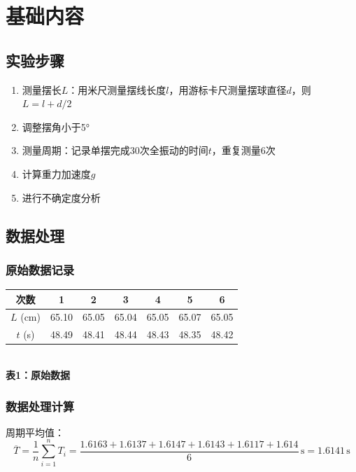 \documentclass[12pt,a4paper]{article}
\begin{document}
\section{基础内容}
    \subsection{实验步骤}
        \begin{enumerate}
            \item 测量摆长$L$：用米尺测量摆线长度$l$，用游标卡尺测量摆球直径$d$，则$L=l+d/2$
            \item 调整摆角小于5°
            \item 测量周期：记录单摆完成30次全振动的时间$t$，重复测量6次
            \item 计算重力加速度$g$
            \item 进行不确定度分析
        \end{enumerate}

    \subsection{数据处理}
        \subsubsection{原始数据记录}
            \begin{center}
                \begin{tabular}{ccccccc}
                    \toprule
                    次数 & 1 & 2 & 3 & 4 & 5 & 6 \\
                    \midrule
                    $L$ (cm) & 65.10 & 65.05 & 65.04 & 65.05 & 65.07 & 65.05 \\
                    $t$ (s) & 48.49 & 48.41 & 48.44 & 48.43 & 48.35 & 48.42 \\
                    \bottomrule
                \end{tabular} \\
                \textbf{表1：原始数据}
            \end{center}
           
        \subsubsection{数据处理计算}
            周期平均值：
            \[
                \overline{T}=\frac{1}{n}\sum_{i=1}^{n}T_i=\frac{1.6163+1.6137+1.6147+1.6143+1.6117+1.614}{6}\,\mathrm{s}=1.6141\,\mathrm{s}
            \]
\end{document}
